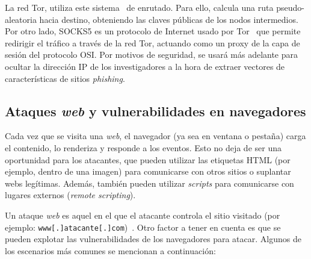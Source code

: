 La red Tor, utiliza este sistema~\cite{TorAndrea2022} de enrutado. Para ello, calcula una ruta pseudo-aleatoria hacia destino, obteniendo las claves públicas de los nodos intermedios. Por otro lado, SOCKS5 es un protocolo de Internet usado por Tor~\cite{SOCKS5Tor2022} que permite redirigir el tráfico a través de la red Tor, actuando como un proxy de la capa de sesión del protocolo OSI. Por motivos de seguridad, se usará más adelante para ocultar la dirección IP de los investigadores a la hora de extraer vectores de características de sitios \textit{phishing}.

\subsection{Ataques \textit{web} y vulnerabilidades en navegadores}

Cada vez que se visita una \textit{web}, el navegador (ya sea en ventana o pestaña) carga el contenido, lo renderiza y responde a los eventos. Esto no deja de ser una oportunidad para los atacantes, que pueden utilizar las etiquetas HTML (por ejemplo, dentro de una imagen) para comunicarse con otros sitios o suplantar webs legítimas. Además, también pueden utilizar \textit{scripts} para comunicarse con lugares externos (\textit{remote scripting}).

Un ataque \textit{web} es aquel en el que el atacante controla el sitio visitado (por ejemplo: \texttt{www[.]atacante[.]com})~\cite{apuntesCybersec}. Otro factor a tener en cuenta es que se pueden explotar las vulnerabilidades de los navegadores para atacar. Algunos de los escenarios más comunes se mencionan a continuación:

